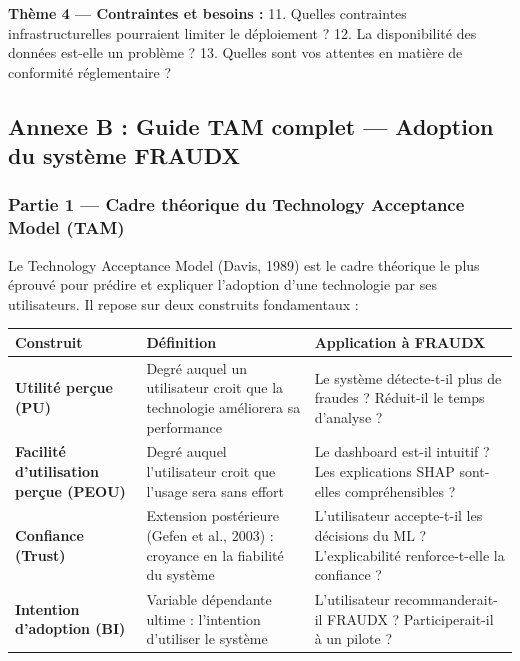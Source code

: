 \documentclass[
  12pt,
]{article}
\newcounter{none} %
\begin{document}
\textbf{Thème 4 — Contraintes et besoins :} 11. Quelles contraintes
infrastructurelles pourraient limiter le déploiement ? 12. La
disponibilité des données est-elle un problème ? 13. Quelles sont vos
attentes en matière de conformité réglementaire ?

\subsection{Annexe B : Guide TAM complet — Adoption du système
FRAUDX}\label{annexe-b-guide-tam-complet-adoption-du-systuxe8me-fraudx}

\subsubsection{Partie 1 — Cadre théorique du Technology Acceptance Model
(TAM)}\label{partie-1-cadre-thuxe9orique-du-technology-acceptance-model-tam}

Le Technology Acceptance Model (Davis, 1989) est le cadre théorique le
plus éprouvé pour prédire et expliquer l’adoption d’une technologie par
ses utilisateurs. Il repose sur deux construits fondamentaux :

{\def\LTcaptype{none} %
\begin{longtable}[]{@{}
  >{\raggedright\arraybackslash}p{}
  >{\raggedright\arraybackslash}p{}
  >{\raggedright\arraybackslash}p{}@{}}
\toprule\noalign{}
\begin{minipage}[b]{\linewidth}\raggedright
Construit
\end{minipage} & \begin{minipage}[b]{\linewidth}\raggedright
Définition
\end{minipage} & \begin{minipage}[b]{\linewidth}\raggedright
Application à FRAUDX
\end{minipage} \\
\midrule\noalign{}
\endhead
\bottomrule\noalign{}
\endlastfoot
\textbf{Utilité perçue (PU)} & Degré auquel un utilisateur croit que la
technologie améliorera sa performance & Le système détecte-t-il plus de
fraudes ? Réduit-il le temps d’analyse ? \\
\textbf{Facilité d’utilisation perçue (PEOU)} & Degré auquel
l’utilisateur croit que l’usage sera sans effort & Le dashboard est-il
intuitif ? Les explications SHAP sont-elles compréhensibles ? \\
\textbf{Confiance (Trust)} & Extension postérieure (Gefen et al., 2003)
: croyance en la fiabilité du système & L’utilisateur accepte-t-il les
décisions du ML ? L’explicabilité renforce-t-elle la confiance ? \\
\textbf{Intention d’adoption (BI)} & Variable dépendante ultime :
l’intention d’utiliser le système & L’utilisateur recommanderait-il
FRAUDX ? Participerait-il à un pilote ? \\
\end{longtable}
}
\end{document}
